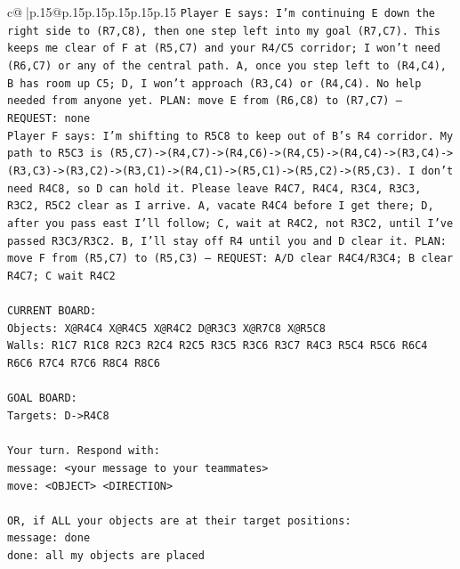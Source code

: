 \documentclass{article}
\begin{document}
{\begin{supertabular}{c@{$\;$}|p{.15\linewidth}@{}p{.15\linewidth}p{.15\linewidth}p{.15\linewidth}p{.15\linewidth}p{.15\linewidth}}
{{{\texttt{Player E says: I'm continuing E down the right side to (R7,C8), then one step left into my goal (R7,C7). This keeps me clear of F at (R5,C7) and your R4/C5 corridor; I won't need (R6,C7) or any of the central path. A, once you step left to (R4,C4), B has room up C5; D, I won't approach (R3,C4) or (R4,C4). No help needed from anyone yet. PLAN: move E from (R6,C8) to (R7,C7) — REQUEST: none} \\
\texttt{Player F says: I'm shifting to R5C8 to keep out of B's R4 corridor. My path to R5C3 is (R5,C7){-}>(R4,C7){-}>(R4,C6){-}>(R4,C5){-}>(R4,C4){-}>(R3,C4){-}>(R3,C3){-}>(R3,C2){-}>(R3,C1){-}>(R4,C1){-}>(R5,C1){-}>(R5,C2){-}>(R5,C3). I don't need R4C8, so D can hold it. Please leave R4C7, R4C4, R3C4, R3C3, R3C2, R5C2 clear as I arrive. A, vacate R4C4 before I get there; D, after you pass east I'll follow; C, wait at R4C2, not R3C2, until I've passed R3C3/R3C2. B, I'll stay off R4 until you and D clear it. PLAN: move F from (R5,C7) to (R5,C3) — REQUEST: A/D clear R4C4/R3C4; B clear R4C7; C wait R4C2} \\
\\ 
\texttt{CURRENT BOARD:} \\
\texttt{Objects: X@R4C4 X@R4C5 X@R4C2 D@R3C3 X@R7C8 X@R5C8} \\
\texttt{Walls: R1C7 R1C8 R2C3 R2C4 R2C5 R3C5 R3C6 R3C7 R4C3 R5C4 R5C6 R6C4 R6C6 R7C4 R7C6 R8C4 R8C6} \\
\\ 
\texttt{GOAL BOARD:} \\
\texttt{Targets: D{-}>R4C8} \\
\\ 
\texttt{Your turn. Respond with:} \\
\texttt{message: <your message to your teammates>} \\
\texttt{move: <OBJECT> <DIRECTION>} \\
\\ 
\texttt{OR, if ALL your objects are at their target positions:} \\
\texttt{message: done} \\
\texttt{done: all my objects are placed} \\
            }
        }
    }
     \\ \\


\end{supertabular}}
\end{document}

